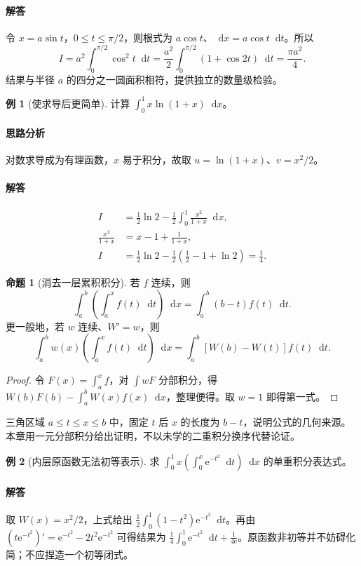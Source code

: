 \documentclass[UTF8,fontset=fandol,12pt,oneside,openany]{ctexrep}
\newcommand{\dd}{\mathop{}\!\mathrm d}
\newcommand{\ee}{\mathrm e}
\theoremstyle{definition}
\newtheorem{proposition}[theorem]{命题}
\newtheorem{example}{例}[chapter]
\begin{document}
\paragraph{解答} 令 $x=a\sin t$，$0\le t\le\pi/2$，则根式为 $a\cos t$、$\dd x=a\cos t\dd t$。所以
\[I=a^2\int_0^{\pi/2}\cos^2t\dd t=\frac{a^2}2\int_0^{\pi/2}(1+\cos2t)\dd t=\frac{\pi a^2}4.\]
结果与半径 $a$ 的四分之一圆面积相符，提供独立的数量级检验。
\begin{example}[使求导后更简单]
计算 $\int_0^1x\ln(1+x)\dd x$。
\end{example}
\paragraph{思路分析} 对数求导成为有理函数，$x$ 易于积分，故取 $u=\ln(1+x)$、$v=x^2/2$。
\paragraph{解答}
\begin{align*}
I&=\frac12\ln2-\frac12\int_0^1\frac{x^2}{1+x}\dd x,\\
\frac{x^2}{1+x}&=x-1+\frac1{1+x},\\
I&=\frac12\ln2-\frac12\left(\frac12-1+\ln2\right)=\frac14.
\end{align*}

\begin{proposition}[消去一层累积积分]
若 $f$ 连续，则
\[\int_a^b\left(\int_a^xf(t)\dd t\right)\dd x=\int_a^b(b-t)f(t)\dd t.\]
更一般地，若 $w$ 连续、$W'=w$，则
\[\int_a^bw(x)\left(\int_a^xf(t)\dd t\right)\dd x=\int_a^b[W(b)-W(t)]f(t)\dd t.\]
\end{proposition}
\begin{proof}
令 $F(x)=\int_a^xf$，对 $\int wF$ 分部积分，得 $W(b)F(b)-\int_a^bW(x)f(x)\dd x$，整理便得。取 $w=1$ 即得第一式。
\end{proof}
三角区域 $a\le t\le x\le b$ 中，固定 $t$ 后 $x$ 的长度为 $b-t$，说明公式的几何来源。本章用一元分部积分给出证明，不以未学的二重积分换序代替论证。
\begin{example}[内层原函数无法初等表示]
求 $\int_0^1x\left(\int_0^x\ee^{-t^2}\dd t\right)\dd x$ 的单重积分表达式。
\end{example}
\paragraph{解答} 取 $W(x)=x^2/2$，上式给出 $\frac12\int_0^1(1-t^2)\ee^{-t^2}\dd t$。再由 $(t\ee^{-t^2})'=\ee^{-t^2}-2t^2\ee^{-t^2}$ 可得结果为 $\frac14\int_0^1\ee^{-t^2}\dd t+\frac1{4\ee}$。原函数非初等并不妨碍化简；不应捏造一个初等闭式。
\end{document}
